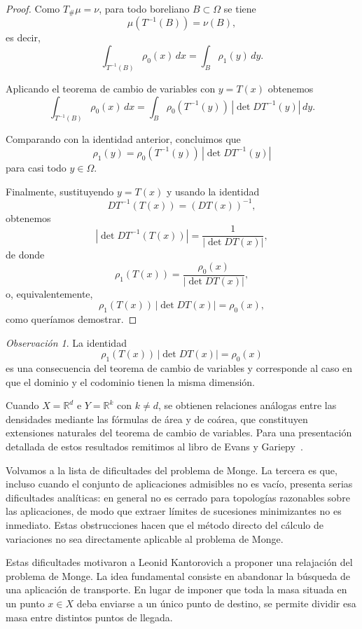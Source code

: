 \documentclass[12pt, a4paper]{amsbook}
\theoremstyle{remark}
\newtheorem{obs}[teo]{Observación}
\theoremstyle{definition}
\numberwithin{section}{chapter}
\numberwithin{subsection}{section}
\numberwithin{equation}{section}
\numberwithin{figure}{chapter}
\begin{document}
\begin{proof}
Como $T_{\#}\mu=\nu$, para todo boreliano $B\subset\Omega$ se tiene
\[
\mu(T^{-1}(B))
=
\nu(B),
\]
es decir,
\[
\int_{T^{-1}(B)}
\rho_0(x)\,dx
=
\int_B
\rho_1(y)\,dy.
\]

Aplicando el teorema de cambio de variables con
$y=T(x)$ obtenemos
\[
\int_{T^{-1}(B)}
\rho_0(x)\,dx
=
\int_B
\rho_0(T^{-1}(y))
\,
\left|
\det DT^{-1}(y)
\right|
\,dy.
\]

Comparando con la identidad anterior, concluimos que
\[
\rho_1(y)
=
\rho_0(T^{-1}(y))
\,
\left|
\det DT^{-1}(y)
\right|
\]
para casi todo $y\in\Omega$.

Finalmente, sustituyendo $y=T(x)$ y usando la identidad
\[
DT^{-1}(T(x))
=
(DT(x))^{-1},
\]
obtenemos
\[
\left|
\det DT^{-1}(T(x))
\right|
=
\frac{1}{|\det DT(x)|},
\]
de donde
\[
\rho_1(T(x))
=
\frac{\rho_0(x)}
{|\det DT(x)|},
\]
o, equivalentemente,
\[
\rho_1(T(x))
\,|\det DT(x)|
=
\rho_0(x),
\]
como queríamos demostrar.
\end{proof}

\begin{obs}
La identidad
\[
\rho_1(T(x))\,|\det DT(x)|=\rho_0(x)
\]
es una consecuencia del teorema de cambio de variables y corresponde al caso en
que el dominio y el codominio tienen la misma dimensión.

Cuando $X=\mathbb{R}^d$ e $Y=\mathbb{R}^k$ con $k\neq d$, se obtienen relaciones
análogas entre las densidades mediante las fórmulas de área y de coárea, que
constituyen extensiones naturales del teorema de cambio de variables. Para una
presentación detallada de estos resultados remitimos al libro de
Evans y Gariepy~\cite{EvansGariepy}.
\end{obs}

Volvamos a la lista de dificultades del problema de Monge. La tercera es que, incluso cuando el conjunto de aplicaciones admisibles no es vacío, presenta serias dificultades analíticas: en general no es cerrado para topologías razonables sobre las aplicaciones, de modo que extraer límites de sucesiones minimizantes no es inmediato. Estas obstrucciones hacen que el método directo del cálculo de variaciones no sea directamente aplicable al problema de Monge.

Estas dificultades motivaron a Leonid Kantorovich a proponer una relajación del problema de Monge. La idea fundamental consiste en abandonar la búsqueda de una aplicación de transporte. En lugar de imponer que toda la masa situada en un punto \(x\in X\) deba enviarse a un único punto de destino, se permite dividir esa masa entre distintos puntos de llegada.
\end{document}
